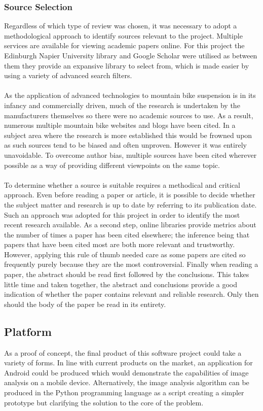 		\subsubsection{Source Selection}
			Regardless of which type of review was chosen, it was necessary to adopt a methodological approach to identify sources relevant to the project. Multiple services are available for viewing academic papers online. For this project the Edinburgh Napier University library and Google Scholar were utilised as between them they provide an expansive library to select from, which is made easier by using a variety of advanced search filters.
			\\\\
			As the  application of advanced technologies to mountain bike suspension is in its infancy and commercially driven, much of the research is undertaken by the manufacturers themselves so there were no academic sources to use. As a result, numerous multiple mountain bike websites and blogs have been cited. In a subject area where the research is more established this would be frowned upon as such sources tend to be biased and often unproven. However it was entirely unavoidable. To overcome author bias, multiple sources have been cited wherever possible as a way of providing different viewpoints on the same topic.
			\\\\
			To determine whether a source is suitable requires a methodical and critical approach. Even before reading a paper or article, it is possible to decide whether the subject matter and research is up to date by referring to its publication date. Such an approach was adopted for this project in order to identify the most recent research available. As a second step, online libraries provide metrics about the number of times a paper has been cited elsewhere; the inference being that papers that have been cited most are both more relevant and trustworthy. However, applying this rule of thumb needed care as some papers are cited so frequently purely because they are the most controversial. Finally when reading a paper, the abstract should be read first followed by the conclusions. This takes little time and taken together, the abstract and conclusions provide a good indication of whether the paper contains relevant and reliable research. Only then should the body of the paper be read in its entirety. 
	\subsection{Platform}
		As a proof of concept, the final product of this software project could take a variety of forms. In line with current products on the market, an application for Android could be produced which would demonstrate the capabilities of image analysis on a mobile device. Alternatively, the image analysis algorithm can be produced in the Python programming language as a script creating a simpler prototype but clarifying the solution to the core of the problem.
